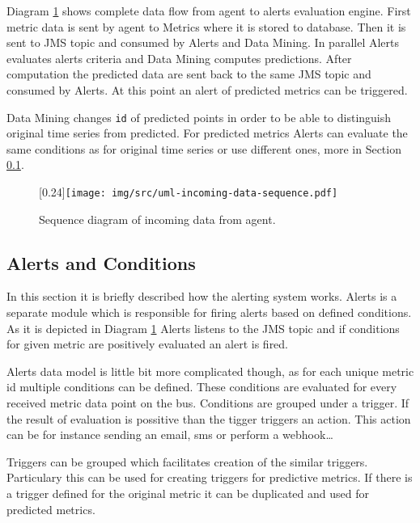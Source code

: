     Diagram \ref{img:sequence-incoming-data} shows complete data flow from agent to alerts evaluation engine.
    First metric data is sent by agent to Metrics where it is stored to database. Then it is sent to JMS topic
    and consumed by Alerts and Data Mining. In parallel Alerts evaluates alerts criteria and Data Mining computes
    predictions. After computation the predicted data are sent back to the same JMS topic and consumed by Alerts.
    At this point an alert of predicted metrics can be triggered.

    Data Mining changes \texttt{id} of predicted points in order to be able to distinguish original time series from
    predicted. For predicted metrics Alerts can evaluate the same conditions as for original time series or use
    different ones, more in Section \ref{sec:alerts-conditions}.

    \begin{figure}[H]
        \begin{center}
            \scalebox{0.33}[0.24]{\texttt{[image: img/src/uml-incoming-data-sequence.pdf]}}
            \caption{Sequence diagram of incoming data from agent.}
            \label{img:sequence-incoming-data}
        \end{center}
    \end{figure}

        \subsection{Alerts and Conditions} \label{sec:alerts-conditions}
        In this section it is briefly described how the alerting system works. Alerts is a separate module
        which is responsible for firing alerts based on defined conditions. As it is depicted in Diagram
        \ref{img:sequence-incoming-data} Alerts listens to the JMS topic and if conditions for given metric are
        positively evaluated an alert is fired.

        Alerts data model is little bit more complicated though, as for each unique metric id multiple conditions can be
        defined. These conditions are evaluated for every received metric data point on the bus. Conditions are
        grouped under a trigger. If the result of evaluation is possitive than the tigger triggers an action. This
        action can be for instance sending an email, sms or perform a webhook\dots

        Triggers can be grouped which facilitates creation of the similar triggers. Particulary this can be used for
        creating triggers for predictive metrics. If there is a trigger defined for the original metric it can be
        duplicated and used for predicted metrics.

